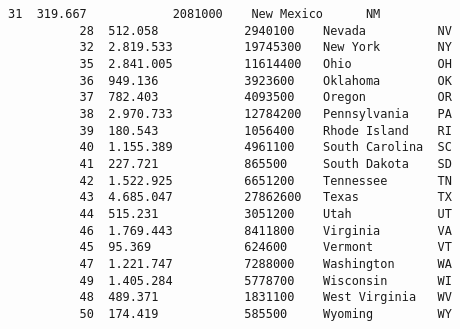 \documentclass[11pt]{article}
\begin{document}
\begin{Verbatim}[commandchars=\\\{\}]
          31  319.667            2081000    New Mexico      NM                  
          28  512.058            2940100    Nevada          NV                  
          32  2.819.533          19745300   New York        NY                  
          35  2.841.005          11614400   Ohio            OH                  
          36  949.136            3923600    Oklahoma        OK                  
          37  782.403            4093500    Oregon          OR                  
          38  2.970.733          12784200   Pennsylvania    PA                  
          39  180.543            1056400    Rhode Island    RI                  
          40  1.155.389          4961100    South Carolina  SC                  
          41  227.721            865500     South Dakota    SD                  
          42  1.522.925          6651200    Tennessee       TN                  
          43  4.685.047          27862600   Texas           TX                  
          44  515.231            3051200    Utah            UT                  
          46  1.769.443          8411800    Virginia        VA                  
          45  95.369             624600     Vermont         VT                  
          47  1.221.747          7288000    Washington      WA                  
          49  1.405.284          5778700    Wisconsin       WI                  
          48  489.371            1831100    West Virginia   WV                  
          50  174.419            585500     Wyoming         WY                  
          

\end{Verbatim}
\end{document}
